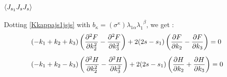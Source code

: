 \documentclass[a4paper,11pt]{article}
\begin{document}
\subsection{$\ev{J_{s_1} J_s J_s}$}
Dotting \eqref{Kkappajs1jsjs} with $b_{\kappa} = (\sigma^{\kappa})\lambda_{1\alpha}\lambda_1^{\;\;\beta}$, we get :
\begin{align}\label{js1jsjseqn1}
&(-k_1+k_2+k_3)\left(\frac{\partial^2 F}{\partial k_2^2}-\frac{\partial^2 F}{\partial k_3^2}\right)+2(2s-s_1)\left(\frac{\partial F}{\partial k_2}-\frac{\partial F}{\partial k_3}\right)=0\notag\\[5 pt]
&(-k_1+k_2-k_3)\left(\frac{\partial^2 H}{\partial k_2^2}-\frac{\partial^2 H}{\partial k_3^2}\right)+2(2s-s_1)\left(\frac{\partial H}{\partial k_2}+\frac{\partial H}{\partial k_3}\right)=0
\end{align}
\end{document}

